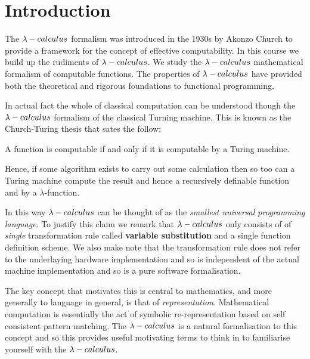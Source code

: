 
\section{Introduction} %
\label{sec:introduction}

The $\lambda-calculus$ formalism was introduced in the 1930s by Akonzo Church
to provide a framework for the concept of effective computability.
In this course we build up the rudiments of $\lambda-calculus$. We study the
$\lambda-calculus$ mathematical formalism of computable functions. The
properties of $\lambda-calculus$ have provided both the theoretical and
rigorous foundations to functional programming.

In actual fact the whole of classical computation can be understood
though the $\lambda-calculus$ formalism of the classical Turning machine. This
is known as the Church-Turing thesis that sates the follow:

\begin{conj}
A function is computable if and only if it is computable by a
Turing machine.
\end{conj}

Hence, if some algorithm exists to carry out some calculation
then so too can a Turing machine compute the result and hence
a recursively definable function and by a $\lambda$-function.

In this way $\lambda-calculus$ can be thought of as the
\emph{smallest universal programming language}. To justify this
claim we remark that $\lambda-calculus$ only consists of of \emph{single}
transformation rule called \textbf{variable substitution} and
a single function definition scheme. We also make note that
the transformation rule does not refer to the underlaying
hardware implementation and so is independent of the actual
machine implementation and so is a pure software formalisation.

The key concept that motivates this is central to mathematics,
and more generally to language in general, is that of
\emph{representation}. Mathematical computation is essentially
the act of symbolic re-representation based on self consistent
pattern matching. The $\lambda-calculus$ is a natural formalisation to this
concept and so this provides useful motivating terms to think in
to familiarise yourself with the $\lambda-calculus$.
